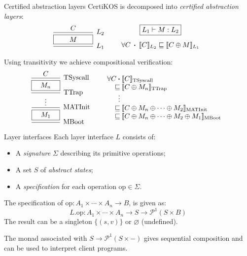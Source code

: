 \documentclass{beamer}
\newcommand{\kw}[1]{\ensuremath{ \mathrm{#1} }}
\newcommand{\bdot}{\boldsymbol{\cdot}}
\begin{document}
\begin{frame}{Certified abstraction layers} %
  CertiKOS is decomposed into
  \emph{certified abstraction layers}:
  \[
    \begin{prooftree}
      \hypo{C}
      \infer1[$L_2$]{\fbox{$\qquad M \qquad$}}
      \infer1[$L_1$]{}
    \end{prooftree}
    \qquad
    \begin{array}{c}
      \fbox{$L_1 \vdash M : L_2$} \\[1em]
      \forall C \: \bdot \:
      \llbracket C \rrbracket_{L_2} \sqsubseteq
      \llbracket C \oplus M \rrbracket_{L_1}
    \end{array}
  \]

  \pause
  Using transitivity we achieve compositional verification:
  \[
    \begin{prooftree}
      \hypo{C}
      \infer1[\kw{TSyscall}]{\fbox{$\quad M_n \quad$}}
      \infer1[\kw{TTrap}]{\vdots}
      \infer1[\kw{MATInit}]{\fbox{$\quad M_1 \quad$}}
      \infer1[\kw{MBoot}]{}
    \end{prooftree}
    \qquad
    \begin{array}{r@{\:}l}
      \forall C \: \bdot &
      \llbracket C \rrbracket_\kw{TSyscall} \\
      \sqsubseteq &
      \llbracket C \oplus M_n \rrbracket_\kw{TTrap} \\
      \vdots &
      \\
      \sqsubseteq &
      \llbracket C \oplus M_n \oplus \cdots \oplus M_2
      \rrbracket_\kw{MATInit} \\
      \sqsubseteq &
      \llbracket C \oplus M_n \oplus \cdots \oplus M_2 \oplus M_1
      \rrbracket_\kw{MBoot}
    \end{array}
  \]
\end{frame}

\begin{frame}{Layer interfaces} %
  Each layer interface $L$ consists of:
  \begin{itemize}
    \pause \item
      A \emph{signature} $\Sigma$ describing its primitive operations;
    \pause \item
      A set $S$ of \emph{abstract states};
    \pause \item
      A \emph{specification} for each operation $\kw{op} \in \Sigma$.
  \end{itemize}

  \pause
  The specification of
  $\kw{op} : A_1 \times \cdots \times A_n \rightarrow B$,
  is given as:
  \[
    L.\kw{op} :
      A_1 \times \cdots \times A_n \rightarrow
      S \rightarrow \mathcal{P}^1(S \times B)
  \]
  \pause
  The result can be a singleton $\{(s, v)\}$
  or $\varnothing$ (undefined).

  \pause
  The monad associated with
  $S \rightarrow \mathcal{P}^1(S \times {-})$
  gives sequential composition and
  can be used to interpret client programs.
%
\end{frame}
\end{document}
